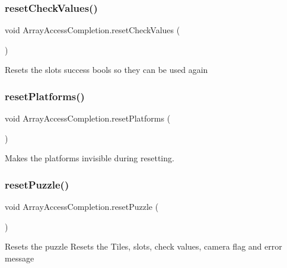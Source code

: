 \subsubsection{\texorpdfstring{reset\+Check\+Values()}{resetCheckValues()}}
{\footnotesize\ttfamily void Array\+Access\+Completion.\+reset\+Check\+Values (\begin{DoxyParamCaption}{ }\end{DoxyParamCaption})}

Resets the slot\textquotesingle{}s success bools so they can be used again \mbox{\label{class_array_access_completion_af92ecc71a759308e06bf8b4d96ca3c78}} 
\subsubsection{\texorpdfstring{reset\+Platforms()}{resetPlatforms()}}
{\footnotesize\ttfamily void Array\+Access\+Completion.\+reset\+Platforms (\begin{DoxyParamCaption}{ }\end{DoxyParamCaption})}



Makes the platforms invisible during resetting. 

\mbox{\label{class_array_access_completion_a317a8a4cc02701f79003290ba3b00f02}} 
\subsubsection{\texorpdfstring{reset\+Puzzle()}{resetPuzzle()}}
{\footnotesize\ttfamily void Array\+Access\+Completion.\+reset\+Puzzle (\begin{DoxyParamCaption}{ }\end{DoxyParamCaption})}

Resets the puzzle Resets the Tiles, slots, check values, camera flag and error message \mbox{\label{class_array_access_completion_a7d73c45ea206180019c5cc0e7a73eb92}} 
